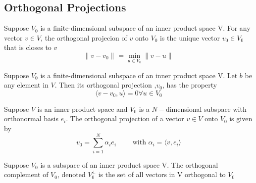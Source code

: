 \subsection{Orthogonal Projections}
\label{subsec:Orthogonal Projections}
\begin{defn}
    Suppose $ V_0 $ is a finite-dimensional subspace of an inner product space V. For any
    vector $ v\in V $, the orthogonal projecion of $ v $ onto $ V_0 $ is the unique vector
    $ v_0 \in V_0 $ that is closes to $ v  $
    \[
        \| v - v_0 \|^{ }_{ } = \min_{u \in V_0} \| v - u \|^{ }_{ } 
    \]
    \label{def:Orthogonal Projection}
\end{defn}
\begin{ftheo}[]
    Suppose $ V_0 $ is a finite-dimensional subspace of an inner product space V. Let $ b
    $ be any element in $ V $. Then its orthogonal projection ,$ v_0 $, has the property 
    \[ \langle v - v_0 , u \rangle = 0 \forall u \in V_0 \]
    \label{th:}
\end{ftheo}
\newpage
\begin{ftheo}
    Suppose $ V $ is an inner product space and $ V_0 $ is a $ N- $dimensional subspace
    with orthonormal basis $ e_i $. The orthogonal projection of a vector $ v \in V $ onto
    $ V_0 $ is given by 
    \[
        v_0 = \sum_{i=1}^{N} \alpha_ie_i \qquad \text{ with } \alpha_i = \langle v     ,
        e_i \rangle 
    \]
    \label{th:Orthogonal Projection}
\end{ftheo}

\begin{exmp}[0.22]
    
\end{exmp}
\begin{exmp}[0.23]
    
\end{exmp}
\begin{defn}
    Suppose $ V_0 $ is a subspace of an inner product space V. The orthogonal complement
    of $ V_0 $, denoted $ V_0^\perp  $ is the set of all vectors in V orthogonal to $ V_0
    $ 
    \label{def:Orthogonal Complement}
\end{defn}


